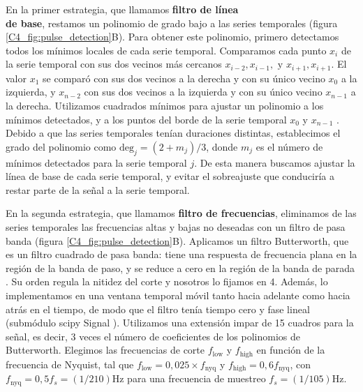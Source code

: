 \documentclass[./main.tex]{subfiles}
\begin{document}
En la primer estrategia, que llamamos \textbf{filtro de línea\\de base}, restamos un polinomio de grado bajo a las series temporales (figura \ref{C4_fig:pulse_detection}B). Para obtener este polinomio, primero detectamos todos los mínimos locales de cada serie temporal. Comparamos cada punto $x_i$ de la serie temporal con sus dos vecinos más cercanos $x_{i-2},x_{i-1}, \text{ y } x_{i+1},x_{i+1}$. El valor $x_1$ se comparó con sus dos vecinos a la derecha y con su único vecino $x_0$ a la izquierda, y $x_{n-2}$ con sus dos vecinos a la izquierda y con su único vecino $x_{n-1}$ a la derecha. Utilizamos cuadrados mínimos para ajustar un polinomio a los mínimos detectados, y a los puntos del borde de la serie temporal $x_0$ y $x_{n-1}$ \cite{Harris2020}. Debido a que las series temporales tenían duraciones distintas, establecimos el grado del polinomio como $\text{deg}_j = (2+m_j) / 3$, donde $m_j$ es el número de mínimos detectados para la serie temporal $j$. De esta manera buscamos ajustar la línea de base de cada serie temporal, y evitar el sobreajuste que conduciría a restar parte de la señal a la serie temporal.  



En la segunda estrategia, que llamamos \textbf{filtro de frecuencias}, eliminamos de las series temporales las frecuencias altas y bajas no deseadas con un filtro de pasa banda (figura \ref{C4_fig:pulse_detection}B). Aplicamos un filtro Butterworth, que es un filtro cuadrado de pasa banda: tiene una respuesta de frecuencia plana en la región de la banda de paso, y se reduce a cero en la región de la banda de parada \cite{Butterworth1930}. Su orden regula la nitidez del corte y nosotros lo fijamos en 4. Además, lo implementamos en una ventana temporal móvil tanto hacia adelante como hacia atrás en el tiempo, de modo que el filtro tenía tiempo cero y fase lineal (submódulo scipy Signal \cite{Virtanen2020}). Utilizamos una extensión impar de 15 cuadros para la señal, es decir, 3 veces el número de coeficientes de los polinomios de Butterworth. Elegimos las frecuencias de corte $f_{\text{low}}$ y $f_{\text{high}}$ en función de la frecuencia de Nyquist, tal que $f_{\text{low}}= 0,025 \times f_{\text{nyq}}$ y $f_{\text{high}}=0,6 f_{\text{nyq}}$, con $f_{\text{nyq}}=0,5 f_s =(1/210) $Hz para una frecuencia de muestreo $f_s=(1/105) $Hz.    
\end{document}
